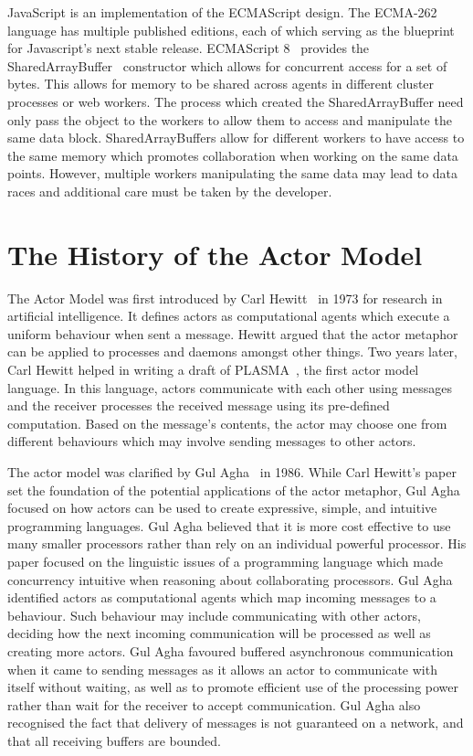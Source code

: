 \documentclass[12pt, a4paper]{report}
\theoremstyle{definition}
\theoremstyle{definition}%
\theoremstyle{definition}%
\theoremstyle{definition}%
\theoremstyle{definition}%
\theoremstyle{definition}%
\begin{document}
JavaScript is an implementation of the ECMAScript design. The ECMA-262 language has multiple published editions, each of which serving as the blueprint for Javascript's next stable release. ECMAScript 8~\cite{ecmascript} provides the SharedArrayBuffer~\cite{sharedarraybuffer} constructor which allows for concurrent access for a set of bytes. This allows for memory to be shared across agents in different cluster processes or web workers. The process which created the SharedArrayBuffer need only pass the object to the workers to allow them to access and manipulate the same data block. SharedArrayBuffers allow for different workers to have access to the same memory which promotes collaboration when working on the same data points. However, multiple workers manipulating the same data may lead to data races and additional care must be taken by the developer.

\section{The History of the Actor Model}
The Actor Model was first introduced by Carl Hewitt~\cite{hewitt1973session}\cite{43years} in 1973 for research in artificial intelligence. It defines actors as computational agents which execute a uniform behaviour when sent a message. Hewitt argued that the actor metaphor can be applied to processes and daemons amongst other things. Two years later, Carl Hewitt helped in writing a draft of PLASMA~\cite{plasma}\cite{chewitthowto}, the first actor model language. In this language, actors communicate with each other using messages and the receiver processes the received message using its pre-defined computation. Based on the message's contents, the actor may choose one from different behaviours which may involve sending messages to other actors.

The actor model was clarified by Gul Agha~\cite{agha1985actors} in 1986. While Carl Hewitt's paper set the foundation of the potential applications of the actor metaphor, Gul Agha focused on how actors can be used to create expressive, simple, and intuitive programming languages. Gul Agha believed that it is more cost effective to use many smaller processors rather than rely on an individual powerful processor. His paper focused on the linguistic issues of a programming language which made concurrency intuitive when reasoning about collaborating processors. Gul Agha identified actors as computational agents which map incoming messages to a behaviour. Such behaviour may include communicating with other actors, deciding how the next incoming communication will be processed as well as creating more actors. Gul Agha favoured buffered asynchronous communication when it came to sending messages as it allows an actor to communicate with itself without waiting, as well as to promote efficient use of the processing power rather than wait for the receiver to accept communication. Gul Agha also recognised the fact that delivery of messages is not guaranteed on a network, and that all receiving buffers are bounded.
\end{document}
